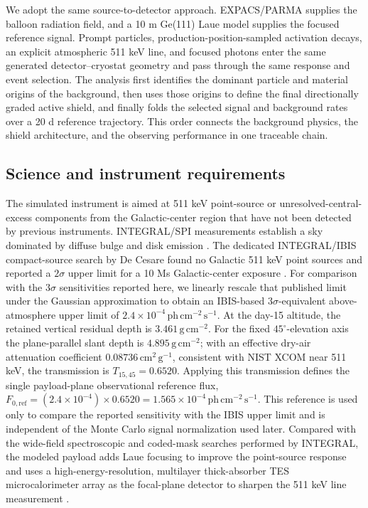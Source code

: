 \documentclass[11pt]{article}
\newcommand{\phcms}{\ensuremath{\,\mathrm{ph\,cm^{-2}\,s^{-1}}}}
\begin{document}
We adopt the same source-to-detector approach. EXPACS/PARMA supplies the
balloon radiation field, and a 10 m Ge(111) Laue model supplies the focused
reference signal. Prompt particles, production-position-sampled activation
decays, an explicit atmospheric 511 keV line, and focused photons enter the
same generated detector--cryostat geometry and pass through the same response
and event selection. The analysis first identifies the dominant particle and
material origins of the background, then uses those origins to define the
final directionally graded active shield, and finally folds the selected signal
and background rates over a 20 d reference trajectory. This order connects the
background physics, the shield architecture, and the observing performance in
one traceable chain.

\subsection{Science and instrument requirements}
\label{sec:requirements}

The simulated instrument is aimed at 511 keV point-source or unresolved-central-excess components from the Galactic-center region that have not been detected by previous instruments. INTEGRAL/SPI measurements establish a sky dominated by diffuse bulge and disk emission \cite{Siegert2016AA,Yoneda2025}. The dedicated INTEGRAL/IBIS compact-source search by De Cesare found no Galactic 511 keV point sources and reported a $2\sigma$ upper limit for a 10 Ms Galactic-center exposure \cite{DeCesare2011}. For comparison with the $3\sigma$ sensitivities reported here, we linearly rescale that published limit under the Gaussian approximation to obtain an IBIS-based $3\sigma$-equivalent above-atmosphere upper limit of $2.4\times10^{-4}\phcms$. At the day-15 altitude, the retained vertical residual depth is $3.461\,\mathrm{g\,cm^{-2}}$. For the fixed $45^\circ$-elevation axis the plane-parallel slant depth is $4.895\,\mathrm{g\,cm^{-2}}$; with an effective dry-air attenuation coefficient $0.08736\,\mathrm{cm^2\,g^{-1}}$, consistent with NIST XCOM near 511 keV, the transmission is $T_{15,45}=0.6520$. Applying this transmission defines the single payload-plane observational reference flux, $F_{0,\mathrm{ref}}=(2.4\times10^{-4})\times0.6520=1.565\times10^{-4}\phcms$. This reference is used only to compare the reported sensitivity with the IBIS upper limit and is independent of the Monte Carlo signal normalization used later. Compared with the wide-field spectroscopic and coded-mask searches performed by INTEGRAL, the modeled payload adds Laue focusing to improve the point-source response and uses a high-energy-resolution, multilayer thick-absorber TES microcalorimeter array as the focal-plane detector to sharpen the 511 keV line measurement \cite{Shirazi2023,Caputo2017}.
\end{document}
